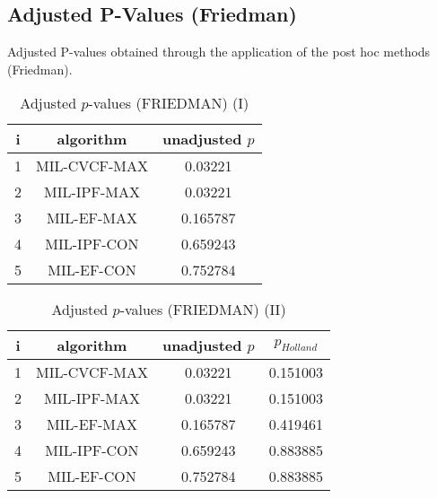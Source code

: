 \documentclass[a4paper,10pt]{article}
\begin{document}
\begin{landscape}
\newpage

\section{Adjusted P-Values (Friedman)}


Adjusted P-values obtained through the application of the post hoc methods (Friedman).

\begin{table}[!htp]
\centering\small
\begin{tabular}{ccc}
i&algorithm&unadjusted $p$\\
\hline1&MIL-CVCF-MAX&0.03221\\2&MIL-IPF-MAX&0.03221\\3&MIL-EF-MAX&0.165787\\4&MIL-IPF-CON&0.659243\\5&MIL-EF-CON&0.752784\\\hline
\end{tabular}
\caption{Adjusted $p$-values (FRIEDMAN) (I)}
\end{table}
\begin{table}[!htp]
\centering\small
\begin{tabular}{cccc}
i&algorithm&unadjusted $p$&$p_{Holland}$\\
\hline1&MIL-CVCF-MAX&0.03221&0.151003\\2&MIL-IPF-MAX&0.03221&0.151003\\3&MIL-EF-MAX&0.165787&0.419461\\4&MIL-IPF-CON&0.659243&0.883885\\5&MIL-EF-CON&0.752784&0.883885\\\hline
\end{tabular}
\caption{Adjusted $p$-values (FRIEDMAN) (II)}
\end{table}

\newpage
\end{landscape}
\end{document}
